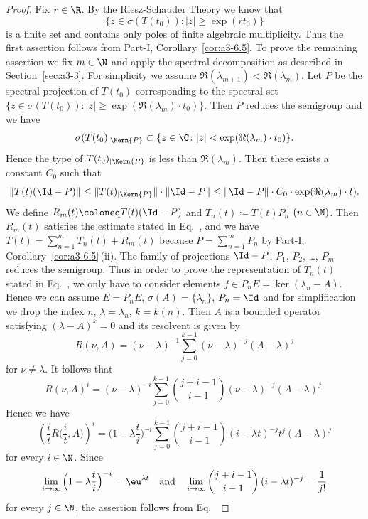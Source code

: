 \begin{proof}
	Fix $r \in \R$.
	By the Riesz-Schauder Theory we know that
	\[
    \{z \in \sigma(T(t_{0})) \colon |z| \geq \exp(rt_{0})\}
    \]
    is a finite set and contains only
	poles of finite algebraic multiplicity.
	Thus the first assertion
	follows from Part-I, Corollary~\ref{cor:a3-6.5}.
	To prove the remaining assertion we fix $m \in \N$ and apply the spectral
	decomposition as described in Section~\ref{sec:a3-3}.
	For simplicity we assume $\Re(\lambda_{m+1}) < \Re(\lambda_m)$.
	Let $P$ be the spectral projection
	of\/ $T(t_{0})$ corresponding to the spectral set $\{z \in \sigma(T(t_{0})) :
	|z| \geq \exp(\Re(\lambda_m) \cdot t_{0})\}$.
	Then $P$ reduces the semigroup and we have
	\[
	\sigma(T(t_{0})_{\vert \Kern{P}} \subset \{z \in \C \colon |z| < \exp(\Re(\lambda_m) \cdot t_{0})\} .
\]
%
	Hence the type of
	$T(t_{0})_{\vert \Kern{P}} $ is less than $\Re(\lambda_m)$.
	Then there exists a constant $C_{0}$ such that
\[
\|T(t)(\Id -P)\| \leq \|T(t)_{\vert \Kern{P}}\|\cdot\|\Id -P\| \leq \|\Id -P\|\cdot C_{0} \cdot \exp(\Re(\lambda_m) \cdot t) .
\]
We define $R_m(t)  \coloneq  T(t)(\Id -P)$ and $T_n(t)  \coloneq  T(t)P_n$ $(n \in \N)$.
Then $R_m(t)$ satisfies the estimate stated in Eq.~, and we have $T(t) =
\sum_{n=1}^m T_n(t) + R_m(t)$ because $P = \sum_{n=1}^m P_n$ by Part-I, Corollary~\ref{cor:a3-6.5}\,(ii).
The family of projections $\Id -P$, $P_1$, $P_2$, \ldots , $P_m$ reduces the semigroup.
Thus in order to prove the representation of\/ $T_n(t)$ stated in
Eq.~, we only have to consider elements $f \in P_n E = \ker(\lambda_n-A)$.
Hence we can assume $E = P_n E$, $\sigma(A) = \{\lambda_n\}$, $P_n = \Id $ and for simplification
we drop the index $n$, \ie  $\lambda = \lambda_n$, $k = k(n)$.
Then $A$ is a bounded operator satisfying $(\lambda - A)^k = 0$ and its resolvent is given by
%
\[
	R(\nu,A) = (\nu-\lambda)^{-1}\sum_{j=0}^{k-1}(\nu-\lambda)^{-j}(A-\lambda)^j
\]
%
for $\nu \neq \lambda$.
It follows that
%
\[
	 R(\nu,A)^i = (\nu-\lambda)^{-i}\sum_{j=0}^{k-1}\binom{j+i-1}{i-1}(\nu-\lambda)^{-j}(A-\lambda)^j .
\]
Hence we have
\[
\left(\frac{i}{t}R\Big(\frac{i}{t},A\Big)\right)^i = \Big(1-\lambda\frac{t}{i}\Big)^{-i}\sum_{j=0}^{k-1}\binom{j+i-1}{i-1}(i-\lambda t)^{-j}t^j(A-\lambda)^j 
\]
for every $i \in \N$.
Since 
%
\[
\lim_{i\to\infty}\Big(1-\lambda\frac{t}{i}\Big)^{-i} = \eu^{\lambda t}
\quad \text{and} \quad \lim_{i\to\infty}\binom{j+i-1}{i-1}\,(i-\lambda t)^{-j} = \frac{1}{j!}
\]
%
for every $j \in \N$, the assertion follows from Eq.~
\end{proof}
